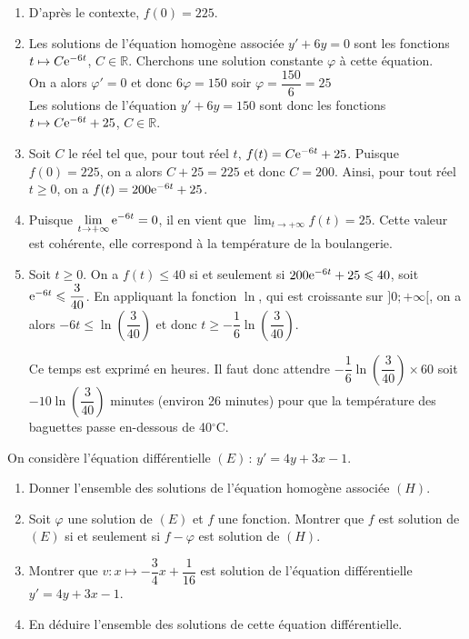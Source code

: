 \documentclass[11pt,fleqn, openany]{book} %
\begin{document}
\begin{solution} \hspace{0pt}
\begin{enumerate}
\item D'après le contexte, $f(0)=225$.
\item Les solutions de l'équation homogène associée $y'+6y=0$ sont les fonctions $t \mapsto C\mathrm{e}^{-6t}$, $C\in\mathbb{R}$. Cherchons une solution constante $\varphi$ à cette équation. \\On a alors $\varphi'=0$ et donc $6\varphi=150$ soir $\varphi = \dfrac{150}{6}=25$\\ Les solutions de l'équation $y'+6y=150$ sont donc les fonctions $t \mapsto C\mathrm{e}^{-6t}+25$, $C\in\mathbb{R}$.

\item Soit $C$ le réel tel que, pour tout réel $t$, $f(t)=C\mathrm{e}^{-6t}+25$. Puisque $f(0)=225$, on a alors $C+25=225$ et donc $C=200$. Ainsi, pour tout réel $t \geqslant 0$, on a $f(t)=200\mathrm{e}^{-6t}+25$.
\item Puisque $\displaystyle\lim_{t \to + \infty}\mathrm{e}^{-6t}=0$, il en vient que  $\displaystyle\lim_{t \to + \infty}f(t)=25$. Cette valeur est cohérente, elle correspond à la température de la boulangerie.
\item Soit $t\geqslant 0$. On a $f(t) \leqslant 40$ si et seulement si $200\mathrm{e}^{-6t}+25 \leqslant 40$, soit $\mathrm{e}^{-6t}\leqslant \dfrac{3}{40}$. En appliquant la fonction $\ln$, qui est croissante sur $]0;+\infty[$, on a alors $-6t \leqslant \ln\left(\dfrac{3}{40}\right)$ et donc $t \geqslant -\dfrac{1}{6}\ln\left(\dfrac{3}{40}\right)$.

Ce temps est exprimé en heures. Il faut donc attendre $-\dfrac{1}{6}\ln\left(\dfrac{3}{40}\right) \times 60$ soit $-10\ln\left(\dfrac{3}{40}\right)$ minutes (environ 26 minutes) pour que la température des baguettes passe en-dessous de 40$^{\circ}$C.

\end{enumerate}\end{solution}




\begin{exercise}On considère l'équation différentielle $(E)\, :\,y'=4y+3x-1$.
\begin{enumerate}
\item Donner l'ensemble des solutions de l'équation homogène associée $(H)$.
\item Soit $\varphi$ une solution de $(E)$ et $f$ une fonction. Montrer que $f$ est solution de $(E)$ si et seulement si $f-\varphi$ est solution de $(H)$.
\item Montrer que  $v:x\mapsto -\dfrac{3}{4}x+\dfrac{1}{16}$ est solution de l'équation différentielle $y'=4y+3x-1$.
\item En déduire l'ensemble des solutions de cette équation différentielle.
\end{enumerate}\end{exercise}
\end{document}

